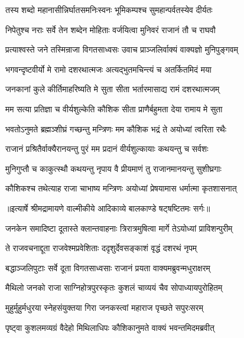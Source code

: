 \twolineshloka
{तस्य शब्दो महानासीन्निर्घातसमनिःस्वनः}
{भूमिकम्पश्च सुमहान्पर्वतस्येव दीर्यतः} %

\twolineshloka
{निपेतुश्च नराः सर्वे तेन शब्देन मोहिताः}
{वर्जयित्वा मुनिवरं राजानं तौ च राघवौ} %

\twolineshloka
{प्रत्याश्वस्ते जने तस्मिन्राजा विगतसाध्वसः}
{उवाच प्राञ्जलिर्वाक्यं वाक्यज्ञो मुनिपुङ्गवम्} %

\twolineshloka
{भगवन्दृष्टवीर्यो मे रामो दशरथात्मजः}
{अत्यद्भुतमचिन्त्यं च अतर्कितमिदं मया} %

\twolineshloka
{जनकानां कुले कीर्तिमाहरिष्यति मे सुता}
{सीता भर्तारमासाद्य रामं दशरथात्मजम्} %

\twolineshloka
{मम सत्या प्रतिज्ञा च वीर्यशुल्केति कौशिक}
{सीता प्राणैर्बहुमता देया रामाय मे सुता} %

\twolineshloka
{भवतोऽनुमते ब्रह्मञ्शीघ्रं गच्छन्तु मन्त्रिणः}
{मम कौशिक भद्रं ते अयोध्यां त्वरिता रथैः} %

\twolineshloka
{राजानं प्रश्रितैर्वाक्यैरानयन्तु पुरं मम}
{प्रदानं वीर्यशुल्कायाः कथयन्तु च सर्वशः} %

\twolineshloka
{मुनिगुप्तौ च काकुत्स्थौ कथयन्तु नृपाय वै}
{प्रीयमाणं तु राजानमानयन्तु सुशीघ्रगाः} %

\twolineshloka
{कौशिकश्च तथेत्याह राजा चाभाष्य मन्त्रिणः}
{अयोध्यां प्रेषयामास धर्मात्मा कृतशासनात्} %


{॥इत्यार्षे श्रीमद्रामायणे वाल्मीकीये आदिकाव्ये बालकाण्डे षट्षष्टितमः सर्गः॥}


\twolineshloka
{जनकेन समादिष्टा दूतास्ते क्लान्तवाहनाः}
{त्रिरात्रमुषित्वा मार्गे तेऽयोध्यां प्राविशन्पुरीम्} %

\twolineshloka
{ते राजवचनाद्दूता राजवेश्मप्रवेशिताः}
{ददृशुर्देवसङ्काशं वृद्धं दशरथं नृपम्} %

\twolineshloka
{बद्धाञ्जलिपुटाः सर्वे दूता विगतसाध्वसाः}
{राजानं प्रयता वाक्यमब्रुवन्मधुराक्षरम्} %

\twolineshloka
{मैथिलो जनको राजा साग्निहोत्रपुरस्कृतः}
{कुशलं चाव्ययं चैव सोपाध्यायपुरोहितम्} %

\twolineshloka
{मुहुर्मुहुर्मधुरया स्नेहसंयुक्तया गिरा}
{जनकस्त्वां महाराज पृच्छते सपुरःसरम्} %

\twolineshloka
{पृष्ट्वा कुशलमव्यग्रं वैदेहो मिथिलाधिपः}
{कौशिकानुमते वाक्यं भवन्तमिदमब्रवीत्} %

